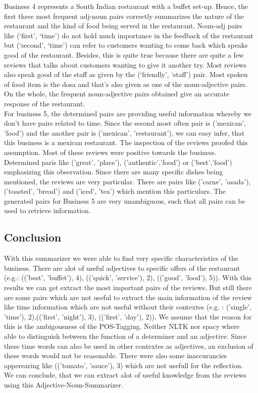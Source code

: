 Business 4 represents a South Indian restaurant with a buffet set-up. Hence, the first three most frequent adj-noun pairs correctly summarizes the nature of the restaurant and the kind of food being served in the restaurant. Noun-adj pairs like (‘first’, ‘time’) do not hold much importance in the feedback of the restaurant but (‘second’, ‘time’) can refer to customers wanting to come back which speaks good of the restaurant. Besides, this is quite true because there are quite a few reviews that talks about customers wanting to give it another try. Most reviews also speak good of the staff as given by the (‘friendly’, ‘staff’) pair. Most spoken of food item is the dosa and that’s also given as one of the noun-adjective pairs. On the whole, the frequent noun-adjective pairs obtained give an accurate response of the restaurant.\\
For business 5, the determined pairs are providing useful information whereby we don't have pairs related to time. Since the second most  often pair is ('mexican', 'food') and the another pair is ('mexican', 'restaurant'), we can easy infer, that this business is a mexican restaurant. The inspection of the reviews proofed this assumption. Most of these reviews were positive towards the business. Determined paris like ('great', 'place'), ('authentic','food') or ('best','food') emphasizing this observation. Since there are many specific dishes being mentioned, the reviews are very particular. There are pairs like ('carne', 'asada'), ('toasted', 'bread') and ('iced', 'tea') which mention this particulars. The generated pairs for Business 5 are very unambiguous, such that all pairs can be used to retrieve information.
	

	
	\subsection{Conclusion}
	With this summarizer we were able to find very specific characteristics of the business. There are alot of useful adjectives to specific offers of the restaurant (e.g.: (('best', 'buffet'), 4), (('quick', 'service'), 2), (('good', 'food'), 5)). With this results we can get extract the most important pairs of the reviews. But still there are some pairs which are not useful to extract the main information of the review like time information which are not useful without their contextes (e.g. : ('single', 'time'), 2),(('first', 'night'), 3), (('first', 'day'), 2)). We assume that the reason for this is the ambigousness of 
	the POS-Tagging. Neither NLTK nor spacy where able to distinguish between the function of a determiner and an adjective. Since these time words can also be used in other contextes as adjectives, an exclusion of these words would not be reasonable. There were also some inaccurancies apperearing like  (('tomato', 'sauce'), 3) which are not usefull for the reflection.
	We can conclude, that we can extract alot of useful knowledge from the reviews using this Adjective-Noun-Summarizer. 
	